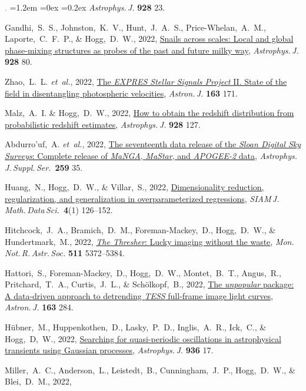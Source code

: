 \documentclass[10pt,letterpaper]{article}
\newcommand{\acronym}[1]{{\small{#1}}}
\newcommand{\foreign}[1]{\textsl{#1}}
\newcommand{\etal}{\foreign{et~al.}}
\newcommand{\project}[1]{\textsl{#1}}
\newcommand{\doi}[2]{\href{http://dx.doi.org/#1}{{#2}}}
\newcommand{\deemph}[1]{\textcolor{grey}{\footnotesize{#1}}}
\newcommand{\pubnumber}[1]{\deemph{{#1}.}}
\newcounter{refpubnum}
\newcommand{\hogglist}{%
    \rightmargin=0in
    \leftmargin=1.2em
    \topsep=0ex
    \partopsep=0pt
    \itemsep=0.2ex
    \parsep=0pt
    \itemindent=-1.0\leftmargin
    \listparindent=0.0\leftmargin
    \settowidth{\labelsep}{~}
    \usecounter{refpubnum}
  }
\begin{document}
\begin{list}{\pubnumber{\therefpubnum}}{\hogglist}
  \textit{Astrophys.\,J.} \textbf{928} 23.  
\item
  Gandhi,~S.~S., Johnston,~K.~V., Hunt,~J.~A.~S., Price-Whelan,~A.~M., Laporte,~C.~F.~P.,
  \& Hogg,~D.~W., 2022,
  \doi{10.3847/1538-4357/ac47f7}{Snails across scales: Local and global phase-mixing structures as probes of the past and future milky way},
  \textit{Astrophys.\,J.} \textbf{928} 80.
\item
  Zhao,~L.~L. \etal, 2022,
  \doi{10.3847/1538-3881/ac5176}{The \project{EXPRES Stellar Signals Project} II. State of the field in disentangling photospheric velocities},
  \textit{Astron.\,J.} \textbf{163} 171.  
\item
  Malz,~A.~I. \& Hogg,~D.~W., 2022,
  \doi{10.3847/1538-4357/ac062f}{How to obtain the redshift distribution from probabilistic redshift estimates},
  \textit{Astrophys.\,J.} \textbf{928} 127.
\item
  Abdurro'uf,~A. \etal, 2022,
  \doi{10.3847/1538-4365/ac4414}{The seventeenth data release of the \project{Sloan Digital Sky Surveys}: Complete release of \project{MaNGA}, \project{MaStar}, and \project{APOGEE-2} data},
  \textit{Astrophys.\,J.\,Suppl.\,Ser.}\ \textbf{259} 35.
\item
  Huang,~N., Hogg,~D.~W., \& Villar,~S., 2022,
  \doi{10.1137/20M1387821}{Dimensionality reduction, regularization, and generalization in overparameterized regressions},
  \textit{\acronym{SIAM}\,J.\,Math.\,Data\,Sci.}\ \textbf{4}(1) 126--152.
\item
  Hitchcock,~J.~A., Bramich,~D.~M., Foreman-Mackey,~D., Hogg,~D.~W., \& Hundertmark,~M., 2022,
  \doi{10.1093/mnras/stac427}{\project{The Thresher}: Lucky imaging without the waste},
  \textit{Mon.\,Not.\,R.\,Astr.\,Soc.} \textbf{511} 5372--5384. 
\item
  Hattori,~S., Foreman-Mackey,~D., Hogg,~D.~W., Montet,~B.~T., Angus,~R., Pritchard,~T.~A.,
  Curtis,~J.~L., \& Sch\"olkopf,~B., 2022,
  \doi{10.3847/1538-3881/ac625a}{The \project{unpopular} package: A data-driven approach to detrending \project{TESS} full-frame image light curves},
  \textit{Astron.\,J.} \textbf{163} 284.
\item
  H\"ubner,~M., Huppenkothen,~D., Lasky,~P.~D., Inglis,~A.~R., Ick,~C., \& Hogg,~D,~W., 2022,
  \doi{10.3847/1538-4357/ac7959}{Searching for quasi-periodic oscillations in astrophysical transients using Gaussian processes},
  \textit{Astrophys.\,J.} \textbf{936} 17.
\item
  Miller,~A.~C., Anderson,~L., Leistedt,~B., Cunningham,~J.~P., Hogg,~D.~W., \& Blei,~D.~M., 2022,

\end{list}
\end{document}
